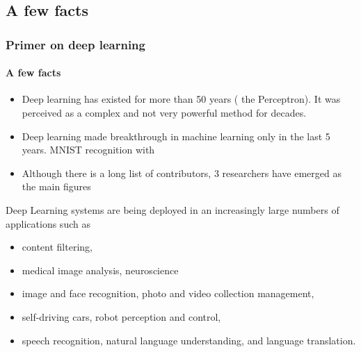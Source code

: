 \documentclass{beamer}
\begin{document}
\subsection{A few facts} 
\begin{frame}
\frametitle{Primer on deep learning}
\framesubtitle{A few facts}
\begin{itemize}
\item Deep learning has existed for more than 50 years (\cite{Rosenblatt 1958} the Perceptron). It was perceived as a complex and not very powerful method for decades.
\item Deep learning made breakthrough in machine learning only in the last 5 years. MNIST recognition with \cite{Lecun 2013}
\item Although there is a long list of contributors, 3 researchers have emerged as the main figures
\cite{Yoshua Lecun Hilton 2015}
\end{itemize}
\end{frame}

\begin{frame}
Deep Learning systems are being deployed in an increasingly large numbers of applications such as
\begin{itemize}
\item content filtering, 
\item medical image analysis, neuroscience
\item image and face recognition, photo and video collection management, 
\item self-driving cars, robot perception and control, 
\item speech recognition, natural language understanding, and language translation.
\end{itemize}
\end{frame}
\end{document}
